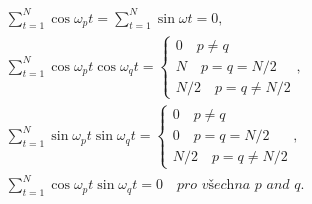 \begin{align}
\sum_{t = 1}^N \cos \omega_p t = \sum_{t = 1}^N \sin \omega t = 0, \nonumber \\
\sum_{t = 1}^N \cos \omega_p t \cos \omega_q t =
\begin{cases}
0 \quad p \ne q\\
N \quad p = q = N/2\\
N/2 \quad p = q \ne N/2
\end{cases}, \nonumber\\
\sum_{t = 1}^N \sin \omega_p t \sin \omega_q t =
\begin{cases}
0 \quad p \ne q\\
0 \quad p = q = N/2\\
N/2 \quad p = q \ne N/2
\end{cases}, \\
\sum_{t = 1}^N \cos \omega_p t \sin \omega_q t = 0 \quad \textit{pro všechna p and q}. \nonumber
\end{align}